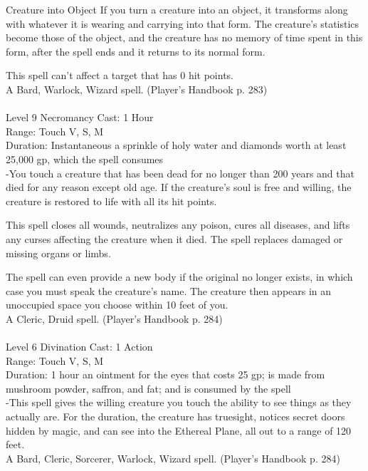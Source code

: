 \documentclass[10pt,twocolumn]{report}
\begin{document}
Creature into Object
If you turn a creature into an object, it transforms along with whatever it is wearing and carrying into that form. The creature’s statistics become those of the object, and the creature has no memory of time spent in this form, after the spell ends and it returns to its normal form.

This spell can’t affect a target that has 0 hit points.\\
A Bard, Warlock, Wizard spell. (Player's Handbook p. 283) \\


 \\
Level 9 \quad Necromancy \quad Cast: 1 Hour\\
Range: Touch \quad V, S, M\\
Duration: Instantaneous \quad a sprinkle of holy water and diamonds worth at least 25,000 gp, which the spell consumes\\
-You touch a creature that has been dead for no longer than 200 years and that died for any reason except old age. If the creature’s soul is free and willing, the creature is restored to life with all its hit points.

This spell closes all wounds, neutralizes any poison, cures all diseases, and lifts any curses affecting the creature when it died. The spell replaces damaged or missing organs or limbs.

The spell can even provide a new body if the original no longer exists, in which case you must speak the creature’s name. The creature then appears in an unoccupied space you choose within 10 feet of you.\\
A Cleric, Druid spell. (Player's Handbook p. 284) \\


 \\
Level 6 \quad Divination \quad Cast: 1 Action\\
Range: Touch \quad V, S, M\\
Duration: 1 hour \quad an ointment for the eyes that costs 25 gp; is made from mushroom powder, saffron, and fat; and is consumed by the spell\\
-This spell gives the willing creature you touch the ability to see things as they actually are. For the duration, the creature has truesight,  notices secret doors hidden by magic, and can see into the Ethereal Plane, all out to a range of 120 feet.\\
A Bard, Cleric, Sorcerer, Warlock, Wizard spell. (Player's Handbook p. 284) \\
\end{document}
